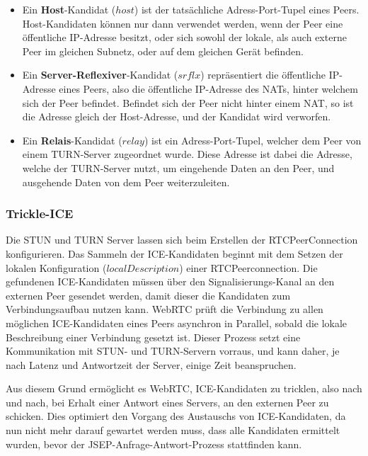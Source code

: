 \begin{itemize}
	\item Ein \textbf{Host}-Kandidat ($host$) ist der tatsächliche Adress-Port-Tupel eines Peers. Host-Kandidaten können nur dann verwendet werden, wenn der Peer eine öffentliche \acs{IP}-Adresse besitzt, oder sich sowohl der lokale, als auch externe Peer im gleichen Subnetz, oder auf dem gleichen Gerät befinden.
	\item Ein \textbf{Server-Reflexiver}-Kandidat ($srflx$) repräsentiert die öffentliche \acs{IP}-Adresse eines Peers, also die öffentliche \acs{IP}-Adresse des \acs{NAT}s, hinter welchem sich der Peer befindet. Befindet sich der Peer nicht hinter einem \acs{NAT}, so ist die Adresse gleich der Host-Adresse, und der Kandidat wird verworfen.
	\item Ein \textbf{Relais}-Kandidat ($relay$) ist ein Adress-Port-Tupel, welcher dem Peer von einem \acs{TURN}-Server zugeordnet wurde. Diese Adresse ist dabei die Adresse, welche der \acs{TURN}-Server nutzt, um eingehende Daten an den Peer, und ausgehende Daten von dem Peer weiterzuleiten.
\end{itemize}

\subsubsection{Trickle-ICE}
Die \acs{STUN} und \acs{TURN} Server lassen sich beim Erstellen der RTCPeerConnection konfigurieren. Das Sammeln der \acs{ICE}-Kandidaten beginnt mit dem Setzen der lokalen Konfiguration ($localDescription$) einer RTCPeerconnection. Die gefundenen \acs{ICE}-Kandidaten müssen über den Signalisierungs-Kanal an den externen Peer gesendet werden, damit dieser die Kandidaten zum Verbindungsaufbau nutzen kann. \acs{WebRTC} prüft die Verbindung zu allen möglichen \acs{ICE}-Kandidaten eines Peers asynchron in Parallel, sobald die lokale Beschreibung einer Verbindung gesetzt ist. Dieser Prozess setzt eine Kommunikation mit \acs{STUN}- und \acs{TURN}-Servern vorraus, und kann daher, je nach Latenz und Antwortzeit der Server, einige Zeit beanspruchen.\par

Aus diesem Grund ermöglicht es \acs{WebRTC}, \acs{ICE}-Kandidaten zu \glqq{}tricklen\grqq{}, also nach und nach, bei Erhalt einer Antwort eines Servers, an den externen Peer zu schicken. Dies optimiert den Vorgang des Austauschs von \acs{ICE}-Kandidaten, da nun nicht mehr darauf gewartet werden muss, dass alle Kandidaten ermittelt wurden, bevor der \acs{JSEP}-Anfrage-Antwort-Prozess stattfinden kann.\par

